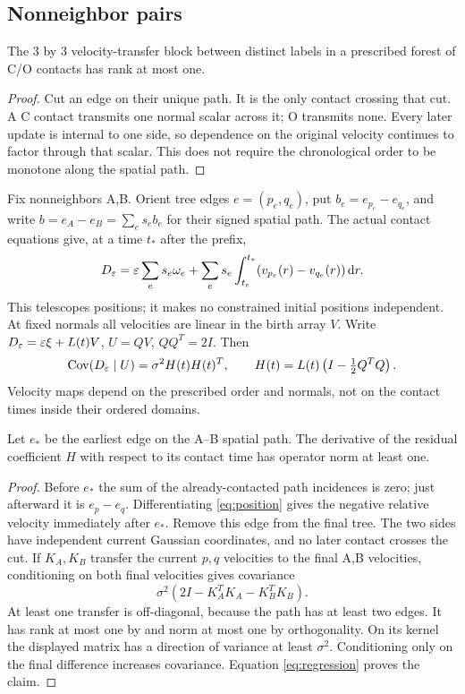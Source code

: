 \subsection{Nonneighbor pairs}
\begin{lemma}\label{lem:rankone}
The $3$ by $3$ velocity-transfer block between distinct labels in a
prescribed forest of C/O contacts has rank at most one.
\end{lemma}
\begin{proof}
Cut an edge on their unique path. It is the only contact crossing that
cut. A C contact transmits one normal scalar across it; O transmits none.
Every later update is internal to one side, so dependence on the original
velocity continues to factor through that scalar. This does not require
the chronological order to be monotone along the spatial path.
\end{proof}

Fix nonneighbors A,B. Orient tree edges $e=(p_e,q_e)$, put
$b_e=e_{p_e}-e_{q_e}$, and write
$b=e_A-e_B=\sum_es_eb_e$ for their signed spatial path.
The actual contact equations give, at a time $t_*$ after the prefix,
\begin{equation}\label{eq:position}
 D_\varepsilon=\varepsilon\sum_es_e\omega_e+
   \sum_es_e\int_{t_e}^{t_*}(v_{p_e}(r)-v_{q_e}(r))\,\mathrm d r .
\end{equation}
This telescopes positions; it makes no constrained initial positions
independent. At fixed normals all velocities are linear in the birth array
$V$. Write $D_\varepsilon=\varepsilon\xi+L(t)V$, $U=QV$, $QQ^T=2I$. Then
\begin{equation}\label{eq:regression}
 \operatorname{Cov}(D_\varepsilon\mid U)=\sigma^2H(t)H(t)^T,\qquad
 H(t)=L(t)\left(I-\tfrac12Q^TQ\right).
\end{equation}
Velocity maps depend on the prescribed order and normals, not on the
contact times inside their ordered domains.

\begin{lemma}\label{lem:slope}
Let $e_*$ be the earliest edge on the A--B spatial path.
The derivative of the residual coefficient $H$ with respect to its
contact time has operator norm at least one.
\end{lemma}
\begin{proof}
Before $e_*$ the sum of the already-contacted path incidences is zero;
just afterward it is $e_p-e_q$. Differentiating \eqref{eq:position} gives
the negative relative velocity immediately after $e_*$.
Remove this edge from the final tree. The two sides have independent
current Gaussian coordinates, and no later contact crosses the cut.
If $K_A,K_B$ transfer the current $p,q$ velocities to the final A,B
velocities, conditioning on both final velocities gives covariance
\[
 \sigma^2(2I-K_A^TK_A-K_B^TK_B).
\]
At least one transfer is off-diagonal, because the path has at least two
edges. It has rank at most one by  and norm at most one
by orthogonality. On its kernel the displayed matrix has a direction of
variance at least $\sigma^2$. Conditioning only on the final difference
increases covariance. Equation \eqref{eq:regression} proves the claim.
\end{proof}

